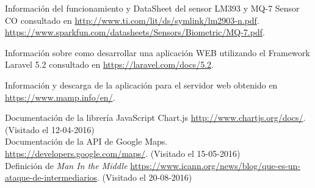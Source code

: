 \begin{thebibliography}{10}
Información del funcionamiento y DataSheet del sensor LM393 y MQ-7 Sensor CO
\newblock consultado en 
\url{http://www.ti.com/lit/ds/symlink/lm2903-n.pdf}.
\url{https://www.sparkfun.com/datasheets/Sensors/Biometric/MQ-7.pdf}.

Información sobre como desarrollar una aplicación WEB utilizando el Framework Laravel 5.2
\newblock consultado en 
\url{https://laravel.com/docs/5.2}.

Información y descarga de la aplicación para el servidor web
\newblock obtenido en 
\url{https://www.mamp.info/en/}.

Documentación de la librería JavaScript Chart.js
\url{http://www.chartjs.org/docs/}.
\newblock (Visitado el 12-04-2016) \\

Documentación de la API de Google Maps.
\url{https://developers.google.com/maps/}.
\newblock (Visitado el 15-05-2016) \\

Definición de \textit{Man In the Middle}
\url{https://www.icann.org/news/blog/que-es-un-ataque-de-intermediarios}.
\newblock (Visitado el 20-08-2016) \\

\end{thebibliography}
